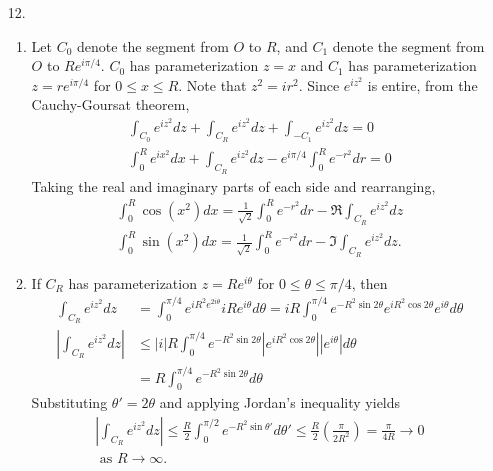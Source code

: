 \documentclass[a4paper,12pt]{article}
\begin{document}
\begin{enumerate}
    \item[12.]
        \begin{enumerate}
            \item
                Let $C_0$ denote the segment from $O$ to $R$, and $C_1$ denote the segment from $O$ to $Re^{i\pi/4}$. $C_0$ has parameterization $z = x$ and $C_1$ has parameterization $z = re^{i\pi/4}$ for $0 \leq x \leq R$. Note that $z^2 = ir^2$. Since $e^{iz^2}$ is entire, from the Cauchy-Goursat theorem,
                \begin{gather*}
                    \int_{C_0} e^{iz^2} dz + \int_{C_R} e^{iz^2} dz + \int_{-C_1} e^{iz^2} dz = 0 \\
                    \int_0^R e^{ix^2} dx + \int_{C_R} e^{iz^2} dz - e^{i\pi/4} \int_0^R e^{-r^2} dr = 0
                \end{gather*}
                Taking the real and imaginary parts of each side and rearranging,
                \begin{gather*}
                    \int_0^R \cos(x^2) dx = \frac{1}{\sqrt{2}} \int_0^R e^{-r^2} dr - \Re \int_{C_R} e^{iz^2} dz \\
                    \int_0^R \sin(x^2) dx = \frac{1}{\sqrt{2}} \int_0^R e^{-r^2} dr - \Im \int_{C_R} e^{iz^2} dz.
                \end{gather*}

            \item
                If $C_R$ has parameterization $z = Re^{i\theta}$ for $0 \leq \theta \leq \pi/4$, then
                \begin{align*}
                    \int_{C_R} e^{iz^2} dz &= \int_0^{\pi/4} e^{iR^2 e^{2i\theta}} iRe^{i\theta} d\theta
                    = iR \int_0^{\pi/4} e^{-R^2 \sin 2\theta} e^{iR^2 \cos 2\theta} e^{i\theta} d\theta \\
                    \left| \int_{C_R} e^{iz^2} dz \right| &\leq |i|R \int_0^{\pi/4} e^{-R^2 \sin 2\theta} \left| e^{iR^2 \cos 2\theta} \right| \left| e^{i\theta} \right| d\theta \\
                    &= R \int_0^{\pi/4} e^{-R^2 \sin 2\theta} d\theta
                \end{align*}
                Substituting $\theta' = 2\theta$ and applying Jordan's inequality yields
                \begin{align*}
                    \left| \int_{C_R} e^{iz^2} dz \right| \leq \frac{R}{2} \int_0^{\pi/2} e^{-R^2 \sin \theta'} d\theta' \leq \frac{R}{2} \left( \frac{\pi}{2R^2} \right) = \frac{\pi}{4R} \to 0 \\
                    \text{\ as\ } R \to \infty.
                \end{align*}


\end{enumerate}
\end{enumerate}
\end{document}
